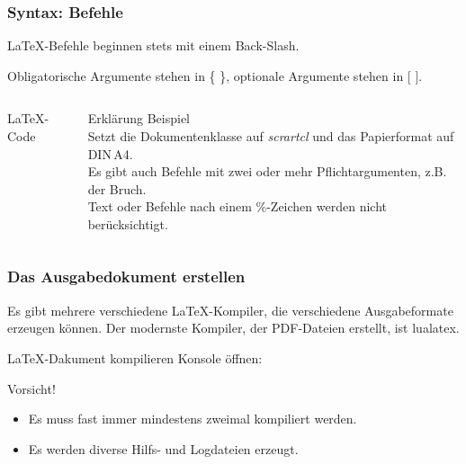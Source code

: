 \begin{frame}[fragile]
    \frametitle{Syntax: Befehle}
    \LaTeX-Befehle beginnen stets mit einem Back-Slash.

    Obligatorische Argumente stehen in \{ \}, optionale Argumente stehen in [ ].
    \begin{columns}[T]
        \begin{column}{0.47\textwidth}
            \begin{block}{\LaTeX-Code}
                \vspace{0.4cm}
            \end{block}
        \end{column}
        \begin{column}{0.47\textwidth}
            \begin{block}{Erklärung}
                Beispiel \\
                Setzt die Dokumentenklasse auf \emph{scrartcl} und das Papierformat auf DIN\,A4. \\
                Es gibt auch Befehle mit zwei oder mehr Pflichtargumenten, z.B. der Bruch. \\
                Text oder Befehle nach einem \%-Zeichen werden nicht berücksichtigt.
            \end{block}
        \end{column}
    \end{columns}
\end{frame}

\begin{frame}[fragile]
    \frametitle{Das Ausgabedokument erstellen}
    Es gibt mehrere verschiedene \LaTeX-Kompiler, die verschiedene Ausgabeformate erzeugen können.
    Der modernste Kompiler, der PDF-Dateien erstellt, ist \alert{lualatex}.

    \begin{block}{\LaTeX-Dakument kompilieren}
        Konsole öffnen:
    \end{block}
    \begin{alertblock}{Vorsicht!}
        \begin{itemize}
        \item Es muss fast immer mindestens zweimal kompiliert werden.
        \item Es werden diverse Hilfs- und Logdateien erzeugt.
        \end{itemize}
    \end{alertblock}
\end{frame}

